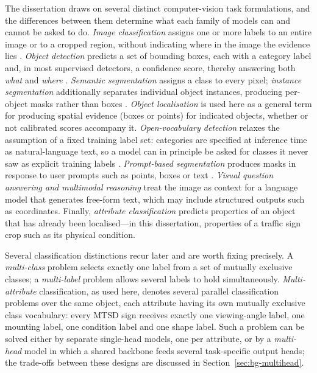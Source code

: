 The dissertation draws on several distinct computer-vision task formulations, and the differences between them determine what each family of models can and cannot be asked to do. \emph{Image classification} assigns one or more labels to an entire image or to a cropped region, without indicating where in the image the evidence lies \citep{krizhevsky2012imagenet}. \emph{Object detection} predicts a set of bounding boxes, each with a category label and, in most supervised detectors, a confidence score, thereby answering both \emph{what} and \emph{where} \citep{everingham2010pascal,lin2014microsoft}. \emph{Semantic segmentation} assigns a class to every pixel; \emph{instance segmentation} additionally separates individual object instances, producing per-object masks rather than boxes \citep{he2017mask}. \emph{Object localisation} is used here as a general term for producing spatial evidence (boxes or points) for indicated objects, whether or not calibrated scores accompany it. \emph{Open-vocabulary detection} relaxes the assumption of a fixed training label set: categories are specified at inference time as natural-language text, so a model can in principle be asked for classes it never saw as explicit training labels \citep{zareian2021open}. \emph{Prompt-based segmentation} produces masks in response to user prompts such as points, boxes or text \citep{kirillov2023segment}. \emph{Visual question answering and multimodal reasoning} treat the image as context for a language model that generates free-form text, which may include structured outputs such as coordinates. Finally, \emph{attribute classification} predicts properties of an object that has already been localised---in this dissertation, properties of a traffic sign crop such as its physical condition.

Several classification distinctions recur later and are worth fixing precisely. A \emph{multi-class} problem selects exactly one label from a set of mutually exclusive classes; a \emph{multi-label} problem allows several labels to hold simultaneously. \emph{Multi-attribute} classification, as used here, denotes several parallel classification problems over the same object, each attribute having its own mutually exclusive class vocabulary: every MTSD sign receives exactly one viewing-angle label, one mounting label, one condition label and one shape label. Such a problem can be solved either by separate single-head models, one per attribute, or by a \emph{multi-head} model in which a shared backbone feeds several task-specific output heads; the trade-offs between these designs are discussed in Section~\ref{sec:bg-multihead}.

